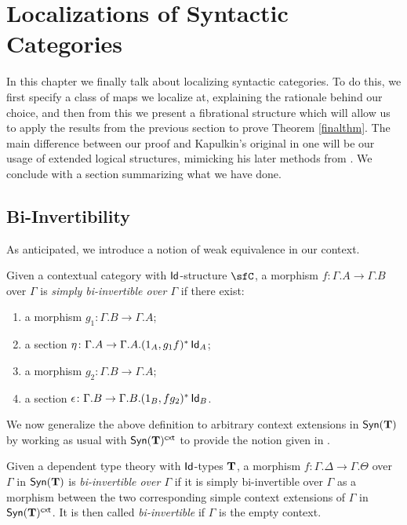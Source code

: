 \chapter{Localizations of Syntactic Categories}\label{chapter4}

In this chapter we finally talk about localizing syntactic categories. To do
this, we first specify a class of maps we localize at, explaining the rationale
behind our choice, and then from this we present a fibrational structure which
will allow us to apply the results from the previous section to prove
Theorem \ref{finalthm}. The main difference between our proof and Kapulkin's
original in one \cite{Kap14} will be our usage of extended logical structures,
mimicking his later methods from \cite{Kap17}. We conclude with a section
summarizing what we have done.

\section{Bi-Invertibility}

As anticipated, we introduce a notion of weak equivalence in our context.

\begin{defn}
  Given a contextual category with $\operatorname{\mathsf{Id}}$-structure $\sfC$, a morphism
  $f\colon\Gamma.A\rightarrow\Gamma.B$ over $\Gamma$ is \emph{simply
    bi-invertible over $\Gamma$} if there exist:
  \begin{enumerate}
    \item a morphism $g_1\colon\Gamma.B\rightarrow\Gamma.A$;
    \item a section
      $\eta\colon\Gamma.A\rightarrow\Gamma.A.(1_{A},g_1f)^*\operatorname{\mathsf{Id}}_{A}$;
    \item a morphism $g_2\colon\Gamma.B\rightarrow\Gamma.A$;
    \item a section
      $\epsilon\colon\Gamma.B\rightarrow\Gamma.B.(1_{B},fg_2)^*\operatorname{\mathsf{Id}}_{B}$.
  \end{enumerate}
\end{defn}

\noindent
We now generalize the above definition to arbitrary context extensions in
$\mathsf{Syn}(\mathbf{T})$ by working as usual with $\mathsf{Syn}(\mathbf{T})^{\operatorname{\mathsf{cxt}}}$ to provide the notion given
in \cite[Def.~1.4]{Kap17}.

\begin{defn}
  Given a dependent type theory with $\operatorname{\mathsf{Id}}$-types $\operatorname{\mathbf{T}}$, a morphism
  $f\colon\Gamma.\Delta\rightarrow\Gamma.\Theta$ over $\Gamma$ in $\mathsf{Syn}(\mathbf{T})$ is
  \emph{bi-invertible over $\Gamma$} if it is simply bi-invertible over $\Gamma$
  as a morphism between the two corresponding simple context extensions of
  $\Gamma$ in $\mathsf{Syn}(\mathbf{T})^{\operatorname{\mathsf{cxt}}}$. It is then called \emph{bi-invertible} if
  $\Gamma$ is the empty context.
\end{defn}

